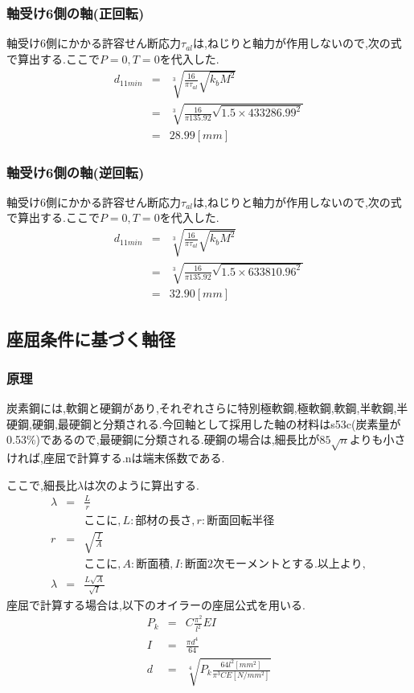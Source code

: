 \documentclass[a4j,twoside,openright,11pt]{jreport}
\begin{document}
\subsubsection{軸受け6側の軸(正回転)}
軸受け6側にかかる許容せん断応力$\tau_{al}$は,ねじりと軸力が作用しないので,次の式で算出する.ここで$P=0,T=0$を代入した.
\begin{eqnarray}
d_{11min} &=& \sqrt [3]{ \frac{16}{\pi \tau_{al}}\sqrt{k_bM^2} }\\
       &=& \sqrt [3]{ \frac{16}{\pi 135.92}\sqrt{1.5 \times 433286.99^2} }\\
       &=& 28.99[mm]
\end{eqnarray}
\subsubsection{軸受け6側の軸(逆回転)}
軸受け6側にかかる許容せん断応力$\tau_{al}$は,ねじりと軸力が作用しないので,次の式で算出する.ここで$P=0,T=0$を代入した.
\begin{eqnarray}
d_{11min} &=& \sqrt [3]{ \frac{16}{\pi \tau_{al}}\sqrt{k_bM^2} }\\
       &=& \sqrt [3]{ \frac{16}{\pi 135.92}\sqrt{1.5 \times 633810.96^2} }\\
       &=& 32.90[mm]
\end{eqnarray}

\subsection{座屈条件に基づく軸径}
\subsubsection{原理}
炭素鋼には,軟鋼と硬鋼があり,それぞれさらに特別極軟鋼,極軟鋼,軟鋼,半軟鋼,半硬鋼,硬鋼,最硬鋼と分類される.今回軸として採用した軸の材料はs53c(炭素量が0.53\%)であるので,最硬鋼に分類される.硬鋼の場合は,細長比が$85 \sqrt n$よりも小さければ,座屈で計算する.nは端末係数である.\\
\par
ここで,細長比$\lambda$は次のように算出する.
\begin{eqnarray}
\lambda &=& \frac{L}{r}\\
&&ここに,L:部材の長さ,r:断面回転半径\\
r&=&\sqrt{\frac{I}{A}}\\
&&ここに,A:断面積,I:断面2次モーメントとする.以上より,\\
\lambda &=& \frac{L\sqrt{A}}{\sqrt{I}}
\end{eqnarray}
座屈で計算する場合は,以下のオイラーの座屈公式を用いる.
\begin{eqnarray}
P_k &=& C\frac{\pi^2}{l^2}EI\\
I&=&\frac{\pi d^4}{64}\\
d&=&\sqrt[4]{P_k\frac{64l^2[mm^2]}{\pi^3CE[N/mm^2]}}
\end{eqnarray}
\end{document}

